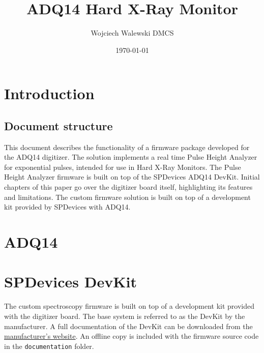 \documentclass[12pt]{article}
\title{ADQ14 Hard X-Ray Monitor}
\author{Wojciech Walewski \newline DMCS}
\date{\today}
\begin{document}
\maketitle

\tableofcontents
\clearpage

\section{Introduction}

	\subsection{Document structure}
	This document describes the functionality of a firmware package developed for the ADQ14 digitizer.
	The solution implements a real time Pulse Height Analyzer for exponential pulses, intended
	for use in Hard X-Ray Monitors. The Pulse Height Analyzer firmware is built on top of the SPDevices ADQ14 DevKit.
	Initial chapters of this paper go over the digitizer board itself, highlighting its features and limitations.
	The custom firmware solution is built on top of a development kit provided by SPDevices with ADQ14.
	\newpage
\section{ADQ14}
	\subsection{}

\section{SPDevices DevKit}
	The custom spectroscopy firmware is built on top of a development kit provided with the digitizer board.
	The base system is referred to as the DevKit by the manufacturer. A full documentation of the DevKit can
	be downloaded from the \href{https://www.spdevices.com/documents/user-guides/24-adq14-development-kit}{manufacturer's website}.
	An offline copy is included with the firmware source code in the \verb|documentation| folder.
\end{document}
